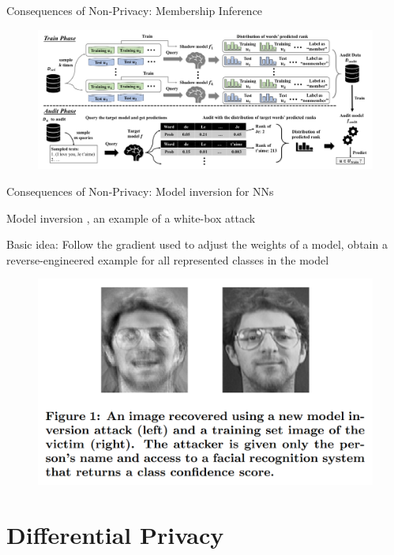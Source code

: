 \documentclass[12pt,aspectratio=169]{beamer}
\begin{document}
\begin{frame}{Consequences of Non-Privacy: Membership Inference}

\begin{figure}
    \centering
    \includegraphics[width=\linewidth]{figures/membership-inference.PNG}
    \caption{\citet{song2019auditing}}
\end{figure}

\end{frame}


\begin{frame}{Consequences of Non-Privacy: Model inversion for NNs}

Model inversion \citep{fredrikson2015model}, an example of a white-box attack

Basic idea: Follow the gradient used to adjust the weights of a model, obtain a reverse-engineered example for all represented classes in the model

\begin{figure}
    \centering
    \includegraphics[width=0.6\linewidth]{figures/model-inversion.png}
    \caption{\citet{fredrikson2015model}}
\end{figure}

\end{frame}


\section{Differential Privacy}
\end{document}
